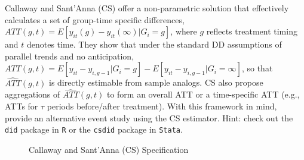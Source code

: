 \documentclass[
  12pt,
]{article}
\begin{document}
Callaway and Sant'Anna (CS) offer a non-parametric solution that
effectively calculates a set of group-time specific differences,
\(ATT(g,t)= E[y_{it}(g) - y_{it}(\infty) | G_{i}=g]\), where \(g\)
reflects treatment timing and \(t\) denotes time. They show that under
the standard DD assumptions of parallel trends and no anticipation,
\(ATT(g,t) = E[y_{it} - y_{i, g-1} | G_{i}=g] - E[y_{it} - y_{i,g-1} | G_{i} = \infty]\),
so that \(\hat{ATT}(g,t)\) is directly estimable from sample analogs. CS
also propose aggregations of \(\hat{ATT}(g,t)\) to form an overall ATT
or a time-specific ATT (e.g., ATTs for \(\tau\) periods before/after
treatment). With this framework in mind, provide an alternative event
study using the CS estimator. Hint: check out the \texttt{did} package
in \texttt{R} or the \texttt{csdid} package in \texttt{Stata}.

\begin{figure}
\caption{Callaway and Sant’Anna (CS) Specification}\label{fig:Fig-5}
\end{figure}
\end{document}
